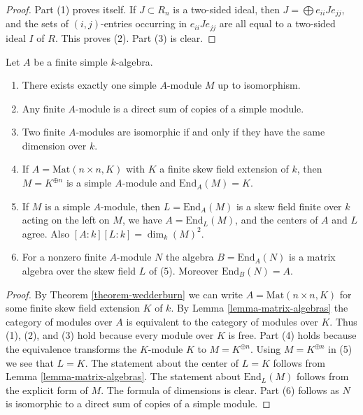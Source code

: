 \begin{proof}
Part (1) proves itself. If $J \subset R_n$ is a two-sided ideal, then
$J = \bigoplus e_{ii}Je_{jj}$, and the sets of $(i,j)$-entries occurring
in $e_{ii}Je_{jj}$ are all equal to a two-sided ideal $I$ of $R$.
This proves (2).
Part (3) is clear.
\end{proof}

\begin{lemma}
\label{lemma-simple-module-unique}
Let $A$ be a finite simple $k$-algebra.
\begin{enumerate}
\item There exists exactly one simple $A$-module $M$ up to isomorphism.
\item Any finite $A$-module is a direct sum of copies of a simple module.
\item Two finite $A$-modules are isomorphic if and only if they
have the same dimension over $k$.
\item If $A = \text{Mat}(n \times n, K)$ with $K$ a finite skew field
extension of $k$, then $M = K^{\oplus n}$ is a simple $A$-module and
$\text{End}_A(M) = K$.
\item If $M$ is a simple $A$-module, then $L = \text{End}_A(M)$
is a skew field finite over $k$ acting on the left on $M$, we have
$A = \text{End}_L(M)$, and the centers of $A$ and $L$ agree.
Also $[A : k] [L : k] = \dim_k(M)^2$.
\item For a nonzero finite $A$-module $N$ the algebra $B = \text{End}_A(N)$ is a
matrix algebra over the skew field $L$ of (5). Moreover $\text{End}_B(N) = A$.
\end{enumerate}
\end{lemma}

\begin{proof}
By
Theorem \ref{theorem-wedderburn}
we can write $A = \text{Mat}(n \times n, K)$ for some finite skew
field extension $K$ of $k$. By
Lemma \ref{lemma-matrix-algebras}
the category of modules over $A$ is equivalent to the category of
modules over $K$. Thus (1), (2), and (3) hold
because every module over $K$ is free. Part (4) holds
because the equivalence transforms the $K$-module $K$
to $M = K^{\oplus n}$. Using $M = K^{\oplus n}$ in (5)
we see that $L = K$. The statement about the center of $L = K$
follows from
Lemma \ref{lemma-matrix-algebras}.
The statement about $\text{End}_L(M)$ follows from the explicit form
of $M$. The formula of dimensions is clear.
Part (6) follows as $N$ is isomorphic to a direct sum of
copies of a simple module.
\end{proof}

